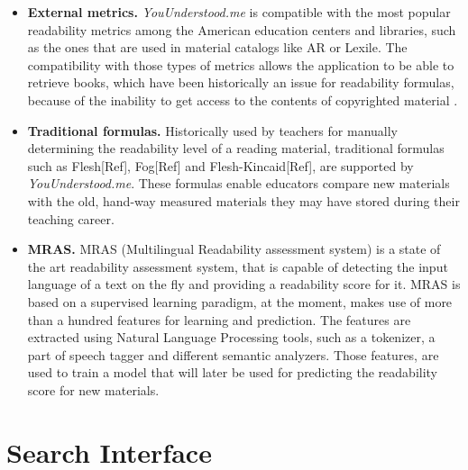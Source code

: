 \documentclass{sig-alternate-05-2015}
\begin{document}
\begin{itemize}
\item \textbf{External metrics.} \textit{YouUnderstood.me} is compatible with the most popular readability metrics among the American education centers and libraries, such as the ones that are used in material catalogs like AR or Lexile. The compatibility with those types of metrics allows the application to be able to retrieve books, which have been historically an issue for readability formulas, because of the inability to get access to the contents of copyrighted material \cite{denning2015readability}.
\item \textbf{Traditional formulas.} Historically used by teachers for manually determining the readability level of a reading material, traditional formulas such as Flesh[Ref], Fog[Ref] and Flesh-Kincaid[Ref], are supported by \textit{YouUnderstood.me}. These formulas enable educators compare new materials with the old, hand-way measured materials they may have stored during their teaching career.
\item \textbf{MRAS.} MRAS\cite{imadrazo2016readability} (Multilingual Readability assessment system) is a state of the art readability assessment system, that is capable of detecting the input language of a text on the fly and providing a readability score for it. MRAS is based on a supervised learning paradigm, at the moment, makes use of more than a hundred features for learning and prediction. The features are extracted using Natural Language Processing tools, such as a tokenizer, a part of speech tagger and different semantic analyzers. Those features, are used to train a model that will later be used for predicting the readability score for new materials.


\end{itemize}











%




\section{Search Interface}
\end{document}
